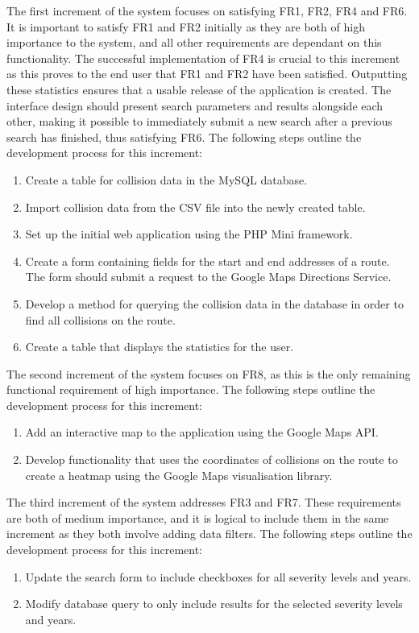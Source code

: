\documentclass[authoryearcitations]{UoYCSproject}
\begin{document}
The first increment of the system focuses on satisfying FR1, FR2, FR4 and FR6. It is important to satisfy FR1 and FR2 initially as they are both of high importance to the system, and all other requirements are dependant on this functionality. The successful implementation of FR4 is crucial to this increment as this proves to the end user that FR1 and FR2 have been satisfied. Outputting these statistics ensures that a usable release of the application is created. The interface design should present search parameters and results alongside each other, making it possible to immediately submit a new search after a previous search has finished, thus satisfying FR6. The following steps outline the development process for this increment:
\begin{enumerate}
	\item Create a table for collision data in the MySQL database.
	\item Import collision data from the CSV file into the newly created table.
	\item Set up the initial web application using the PHP Mini framework.
	\item Create a form containing fields for the start and end addresses of a route. The form should submit a request to the Google Maps Directions Service.
	\item Develop a method for querying the collision data in the database in order to find all collisions on the route.
	\item Create a table that displays the statistics for the user.
\end{enumerate}

The second increment of the system focuses on FR8, as this is the only remaining functional requirement of high importance. The following steps outline the development process for this increment:
\begin{enumerate}
	\item Add an interactive map to the application using the Google Maps API.
	\item Develop functionality that uses the coordinates of collisions on the route to create a heatmap using the Google Maps visualisation library.
\end{enumerate}

The third increment of the system addresses FR3 and FR7. These requirements are both of medium importance, and it is logical to include them in the same increment as they both involve adding data filters. The following steps outline the development process for this increment:
\begin{enumerate}
	\item Update the search form to include checkboxes for all severity levels and years.
	\item Modify database query to only include results for the selected severity levels and years.
\end{enumerate}
\end{document}
